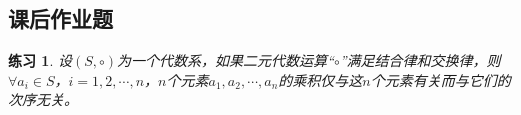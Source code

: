 \documentclass{article}
\newtheorem{Exercise}{练习}
\begin{document}
\begin{CJK*}{UTF8}{gbsn}
  \section{课后作业题}
  \begin{Exercise}
    设$(S,\circ)$为一个代数系，如果二元代数运算“$\circ$”满足结合律和交换律，则$\forall a_i\in S$，$i=1,2,\cdots,n$，$n$个元素$a_1,a_2,\cdots,a_n$的乘积仅与这$n$个元素有关而与它们的次序无关。
  \end{Exercise}


\end{CJK*}
\end{document}
